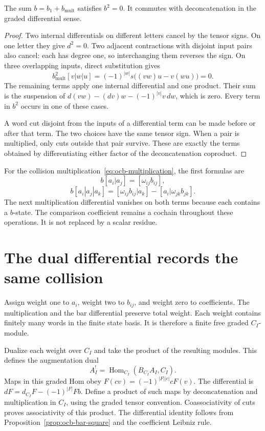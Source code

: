 \begin{proposition}\label{prop:ocb-bar-square}
The sum $b=b_1+b_{\mathrm{mult}}$ satisfies $b^2=0$.
It commutes with deconcatenation in the graded differential sense.
\end{proposition}

\begin{proof}
Two internal differentials on different letters cancel by the tensor
signs. On one letter they give $d^2=0$.
Two adjacent contractions with disjoint input pairs also cancel:
each has degree one, so interchanging them reverses the sign.
On three overlapping inputs, direct substitution gives
\[
 b_{\mathrm{mult}}^2[v|w|u]
 =(-1)^{|w|}s\bigl((vw)u-v(wu)\bigr)=0.
\]
The remaining terms apply one internal differential and one product.
Their sum is the suspension of
$d(vw)-(dv)w-(-1)^{|v|}v\,dw$, which is zero.
Every term in $b^2$ occurs in one of these cases.

A word cut disjoint from the inputs of a differential term can be
made before or after that term.
The two choices have the same tensor sign.
When a pair is multiplied, only cuts outside that pair survive.
These are exactly the terms obtained by differentiating either
factor of the deconcatenation coproduct.
\end{proof}

For the collision multiplication~\eqref{eq:ocb-multiplication},
the first formulas are
\[
 b[a_i|a_j]=[\omega_{ij}b_{ij}],
\]
\[
 b[a_i|a_j|a_k]
 =[\omega_{ij}b_{ij}|a_k]
  -[a_i|\omega_{jk}b_{jk}].
\]
The next multiplication differential vanishes on both terms because
each contains a $b$-state.
The comparison coefficient remains a cochain throughout these
operations. It is not replaced by a scalar residue.

\section{The dual differential records the same collision}

Assign weight one to $a_i$, weight two to $b_{ij}$, and weight
zero to coefficients. The multiplication and the bar differential
preserve total weight.
Each weight contains finitely many words in the finite state basis.
It is therefore a finite free graded $C_I$-module.

Dualize each weight over $C_I$ and take the product of the resulting
modules. This defines the augmentation dual
\[
 A_I^!=\operatorname{Hom}_{C_I}(B_{C_I}A_I,C_I).
\]
Maps in this graded Hom obey
$F(cv)=(-1)^{|F||c|}cF(v)$.
The differential is
$dF=d_{C_I}F-(-1)^{|F|}Fb$.
Define a product of such maps by deconcatenation and multiplication
in $C_I$, using the graded tensor convention.
Coassociativity of cuts proves associativity of this product.
The differential identity follows from
Proposition~\ref{prop:ocb-bar-square} and the coefficient Leibniz rule.

